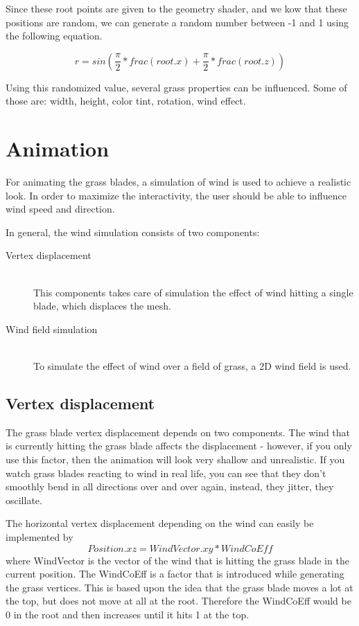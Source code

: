 \documentclass[conference]{acmsiggraph}
\begin{document}
Since these root points are given to the geometry shader, and we kow that these positions are random, we can generate a random number between -1 and 1 using the following equation.

\begin{equation}
r = sin(\frac{\pi}2 * frac(root.x) + \frac{\pi}2 * frac(root.z))
\end{equation}

Using this randomized value, several grass properties can be influenced. Some of those are: width, height, color tint, rotation, wind effect.

\section{Animation}
For animating the grass blades, a simulation of wind is used to achieve a realistic look. In order to maximize the interactivity, the user should be able to influence wind speed and direction. 

In general, the wind simulation consists of two components:

\begin{description}
  \item[Vertex displacement] \hfill \\
  This components takes care of simulation the effect of wind hitting a single blade, which displaces the mesh.
  \item[Wind field simulation] \hfill \\
  To simulate the effect of wind over a field of grass, a 2D wind field is used.
\end{description}

\subsection{Vertex displacement}
The grass blade vertex displacement depends on two components. The wind that is currently hitting the grass blade affects the displacement - however, if you only use this factor, then the animation will look very shallow and unrealistic. If you watch grass blades reacting to wind in real life, you can see that they don't smoothly bend in all directions over and over again, instead, they jitter, they oscillate.

The horizontal vertex displacement depending on the wind can easily be implemented by
\begin{equation}
Position.xz = WindVector.xy * WindCoEff
\end{equation}
where WindVector is the vector of the wind that is hitting the grass blade in the current position. The WindCoEff is a factor that is introduced while generating the grass vertices. This is based upon the idea that the grass blade moves a lot at the top, but does not move at all at the root. Therefore the WindCoEff would be 0 in the root and then increases until it hits 1 at the top.
\end{document}
